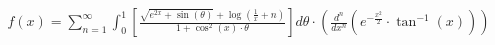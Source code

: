 \documentclass[preview]{standalone}
\begin{document}
\begin{align*}
f(x) = \sum_{n=1}^{\infty} \int_{0}^{1} \left[ \frac{\sqrt{e^{2x} + \sin(\theta)} + \log\left(\frac{1}{x} + n\right)}{1 + \cos^2(x) \cdot \theta} \right] d\theta \cdot \left( \frac{d^n}{dx^n} \left( e^{-\frac{x^2}{2}} \cdot \tan^{-1}(x) \right) \right)
\end{align*}
\end{document}
